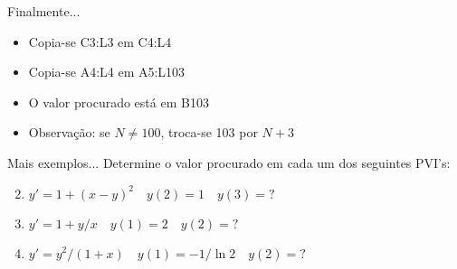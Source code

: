 
                \begin{frame}{Finalmente...}

                    \begin{itemize}
                        \item Copia-se C3:L3 em C4:L4
                        \item Copia-se A4:L4 em A5:L103
                        \item O valor procurado está em B103
                        \item \alert{Observação:} se \(N \neq 100\), troca-se 103 por \(N+3\)
                    \end{itemize}

                \end{frame}

                \begin{frame}{Mais exemplos...}
                    Determine o valor procurado em cada um dos seguintes PVI's:

                    \begin{enumerate}\setcounter{enumi}{1}
                        \item \(y'=1+(x-y)^2 \quad y(2)=1 \quad y(3)=?\)
                        \item \(y'=1+y/x \quad y(1)=2 \quad y(2)=?\)
                        \item \(y'=y^2/(1+x) \quad y(1)=-1/\ln{2} \quad y(2)=?\)
                    \end{enumerate}

                \end{frame}
